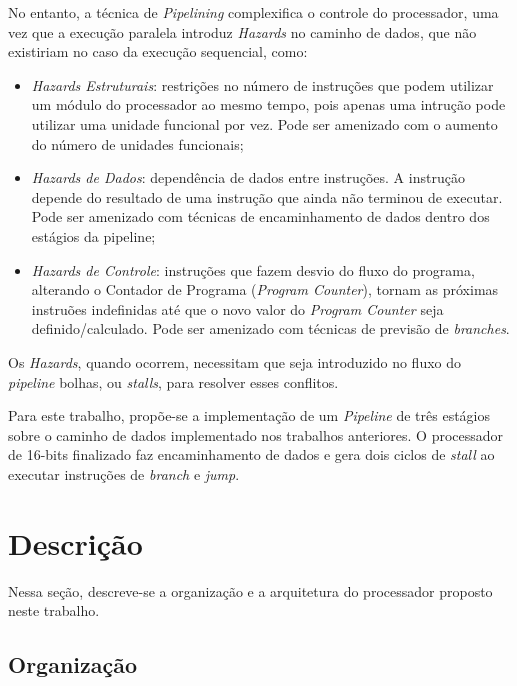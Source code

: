 \documentclass[11pt,a4paper,titlepage]{article}
\begin{document}
No entanto, a técnica de \textit{Pipelining} complexifica o controle do processador, uma vez que a execução paralela introduz \textit{Hazards} no caminho de dados, que não existiriam no caso da execução sequencial, como:

\begin{itemize}

\item \textit{Hazards Estruturais}: restrições no número de instruções que podem utilizar um módulo do processador ao mesmo tempo, pois apenas uma intrução pode utilizar uma unidade funcional por vez. Pode ser amenizado com o aumento do número de unidades funcionais;

\item \textit{Hazards de Dados}: dependência de dados entre instruções. A instrução depende do resultado de uma instrução que ainda não terminou de executar. Pode ser amenizado com técnicas de encaminhamento de dados dentro dos estágios da pipeline;

\item \textit{Hazards de Controle}: instruções que fazem desvio do fluxo do programa, alterando o Contador de Programa (\textit{Program Counter}), tornam as próximas instruões indefinidas até que o novo valor do \textit{Program Counter} seja definido/calculado. Pode ser amenizado com técnicas de previsão de \textit{branches}.

\end{itemize}

Os \textit{Hazards}, quando ocorrem, necessitam que seja introduzido no fluxo do \textit{pipeline} bolhas, ou \textit{stalls}, para resolver esses conflitos.

Para este trabalho, propõe-se a implementação de um \textit{Pipeline} de três estágios sobre o caminho de dados implementado nos trabalhos anteriores. O processador de 16-bits finalizado faz encaminhamento de dados e gera dois ciclos de \textit{stall} ao executar instruções de \textit{branch} e \textit{jump}.

\section{Descrição}\label{sec:desc}

Nessa seção, descreve-se a organização e a arquitetura do processador proposto neste trabalho.

\subsection{Organização}
\end{document}
